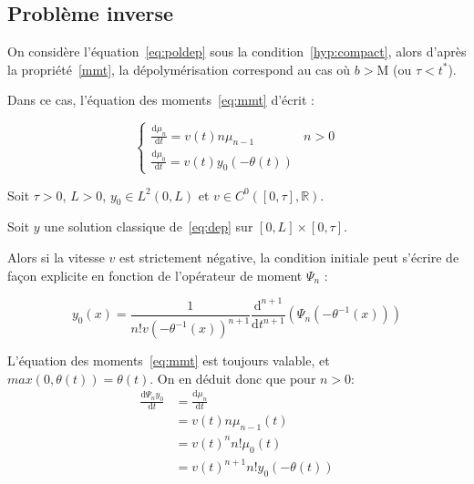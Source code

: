 \documentclass[a4paper]{article}
\newcommand{\mass}{\mathrm{M}}
\newcommand{\dep}{b}
\begin{document}
\subsection{Problème inverse}

On considère l'équation~\eqref{eq:poldep} sous la condition~\eqref{hyp:compact}, 
alors d'après la propriété~\ref{mmt},
la dépolymérisation correspond au cas où $\dep>\mass$ (ou $\tau<t^*$).

Dans ce cas, l'équation des moments~\eqref{eq:mmt} d'écrit :

\begin{equation}
\begin{cases}
\displaystyle \frac{\mathrm{d} \mu_n }{\mathrm{d}t} = v(t) n \mu_{n-1} & n>0 \\
\displaystyle \frac{\mathrm{d} \mu_0 }{\mathrm{d}t} = v(t) y_0(-\theta(t))
\end{cases}
\end{equation}

\begin{proposition}
	Soit $\tau >0$, $L>0$, $y_0 \in L^2(0,L)$ et $v \in C^0([0,\tau],\mathbb{R})$.
	
	Soit $y$ une solution classique de~\eqref{eq:dep} sur $[0,L] \times [0,\tau]$.
	
	Alors si la vitesse $v$ est strictement négative, la condition initiale peut s'écrire de façon explicite 
	en fonction de l'opérateur de moment $\Psi_n$ :
	
	\begin{equation}
		\label{mexplicit}
		y_0(x) = \frac{1}{n! v(-\theta^{-1}(x))^{n+1}} \frac{\mathrm{d}^{n+1}}{\mathrm{d}t^{n+1}} (\Psi_n(-\theta^{-1}(x)))
	\end{equation}
\end{proposition}

\begin{preuve}
L'équation des moments~\eqref{eq:mmt} est toujours valable, et $max(0,\theta(t))=\theta(t)$.
On en déduit donc que pour $n>0$:
\[
\begin{split}
	\frac{\mathrm{d} \Psi_n y_0 }{\mathrm{d}t} &= \frac{\mathrm{d} \mu_n }{\mathrm{d}t}\\
	                                      &= v(t) n \mu_{n-1} (t)\\
										  &= v(t)^{n} n! \mu_0(t)\\
										  &= v(t)^{n+1} n!  y_0(-\theta(t))  
\end{split}
\]
\end{preuve}
\end{document}
